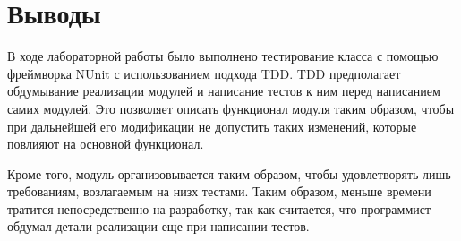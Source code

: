 \documentclass[a4paper,14pt]{extarticle}
\begin{document}
\section*{Выводы}
В ходе лабораторной работы было выполнено тестирование класса с помощью фреймворка NUnit
с использованием подхода TDD. TDD предполагает обдумывание реализации модулей и написание
тестов к ним перед написанием самих модулей. Это позволяет описать функционал модуля
таким образом, чтобы при дальнейшей его модификации не допустить таких изменений,
которые повлияют на основной функционал.

Кроме того, модуль организовывается таким образом, чтобы удовлетворять лишь требованиям,
возлагаемым на низх тестами. Таким образом, меньше времени тратится непосредственно на
разработку, так как считается, что программист обдумал детали реализации еще при написании
тестов.
\end{document}
